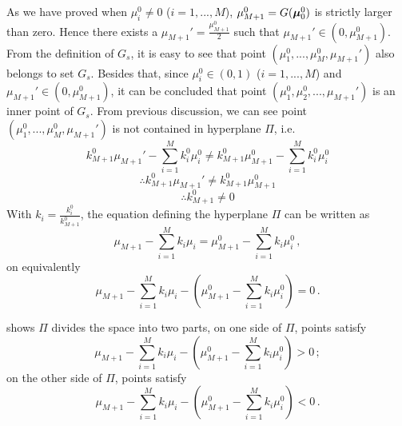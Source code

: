 As  we have proved when $\mu^0_i\neq 0$ ($i=1, ..., M$), $\mu_{M+1}^0 = G(\boldsymbol{\mu}_0^0) $ is strictly larger than zero. Hence there exists a $\mu_{M+1}' = \frac{\mu_{M+1}^0}{2}$ such that $\mu_{M+1}' \in (0, \mu_{M+1}^0)$. From the definition of $G_s$, it is easy to see that point $(\mu^0_1, ..., \mu^0_M, \mu_{M+1}')$ also belongs to set $G_s$. Besides that, since $\mu^0_i \in (0, 1)$ ($i=1, ..., M$) and $\mu_{M+1}' \in (0, \mu_{M+1}^0)$, it can be concluded that point $(\mu_1^0, \mu_2^0, ..., \mu_{M+1}')$ is an inner point of $G_s$.
From previous discussion, we can see point $(\mu^0_1, ..., \mu^0_M, \mu_{M+1}')$ is not contained in hyperplane $\Pi$, i.e.
\[
k_{M+1}^0\mu_{M+1}' - \sum_{i=1}^{M}k_i^0\mu_i^0 \neq k_{M+1}^0\mu_{M+1}^0 - \sum_{i=1}^{M}k_i^0\mu_i^0
\]
\[
\therefore k_{M+1}^0\mu_{M+1}' \neq k_{M+1}^0\mu_{M+1}^0
\]
\[
\therefore k_{M+1}^0 \neq 0
\]
With $k_i = \frac{k_i^0}{k_{M+1}^0}$, the equation defining the hyperplane $\Pi$ can be written as
\begin{equation}
\label{PI2}
\mu_{M+1} - \sum_{i=1}^{M}k_i\mu_i = \mu_{M+1}^0 - \sum_{i=1}^{M}k_i\mu_i^0\,,
\end{equation}
on equivalently 
\begin{equation}
\label{PI2b}
\mu_{M+1} - \sum_{i=1}^{M}k_i\mu_i - (\mu_{M+1}^0 - \sum_{i=1}^{M}k_i\mu_i^0) = 0\,.
\end{equation}

\cite{planeside} shows $\Pi$ divides the space into two parts, on one side of $\Pi$, points satisfy
\[
\mu_{M+1} - \sum_{i=1}^{M}k_i\mu_i - (\mu_{M+1}^0 - \sum_{i=1}^{M}k_i\mu_i^0) > 0\,;
\]
on the other side of $\Pi$, points satisfy
\[
\mu_{M+1} - \sum_{i=1}^{M}k_i\mu_i - (\mu_{M+1}^0 - \sum_{i=1}^{M}k_i\mu_i^0) < 0\,.
\]

